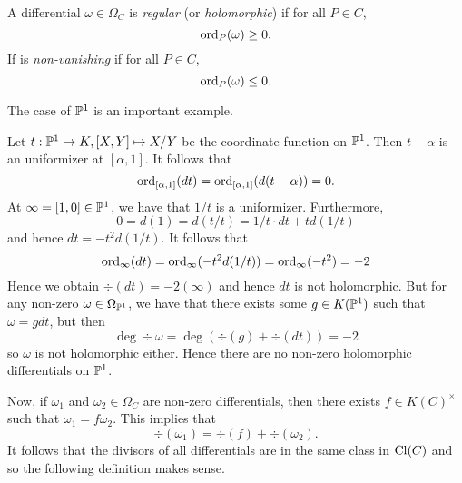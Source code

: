\begin{definition}
	A differential $\omega \in \Omega_C$ is \emph{regular} (or \emph{holomorphic})
	if for all $P \in C$,
	\begin{equation*}
		\operatorname{ord}_P(\omega) \geq 0.
	\end{equation*}
	If is \emph{non-vanishing} if for all $P \in C$,
	\begin{equation*}
		\operatorname{ord}_P(\omega) \leq 0.
	\end{equation*}
\end{definition}

The case of $\mathbb{P}^1$ is an important example.
\begin{example}
	\label{ex:proj-holomorphic}
	Let $t:\mathbb{P}^1 \to K, [X, Y]\mapsto X/Y$ be the coordinate function on
	$\mathbb{P}^1$. Then $t - \alpha$ is an uniformizer at $[\alpha, 1]$.
	It follows that
	\begin{equation*}
		\operatorname{ord}_{[\alpha, 1]}(dt) = \operatorname{ord}_{[\alpha, 1]}(d(t - \alpha)) = 0.
	\end{equation*}
	At $\infty = [1, 0]\in \mathbb{P}^1$, we have that $1/t$ is a uniformizer.
	Furthermore,
	\begin{equation*}
		0 = d(1) = d(t/t) = 1/t\cdot dt + td(1/t)
	\end{equation*}
	and hence $dt = -t^2d(1/t)$. It follows that 
	\begin{equation*}
		\operatorname{ord}_{\infty}(dt) = \operatorname{ord}_{\infty}(-t^2d(1/t)) = 
		\operatorname{ord}_{\infty}(-t^2) = -2
	\end{equation*}
	Hence we obtain $\div(dt) = -2(\infty)$ and hence $dt$ is not holomorphic.
	But for any non-zero $\omega \in \Omega_{\mathbb{P}^1}$, 
	we have that there exists some $g \in K(\mathbb{P}^1)$ such that 
	$\omega = gdt$, but then
	\begin{equation*}
		\deg\div \omega = \deg(\div(g) + \div(dt)) = -2
	\end{equation*}
	so $\omega$ is not holomorphic either.
	Hence there are no non-zero holomorphic differentials on $\mathbb{P}^1$.
\end{example}

Now, if $\omega_1$ and $\omega_2 \in \Omega_C$ are non-zero differentials, then
there exists $f\in K(C)^\times$ such that $\omega_1 = f\omega_2$.
This implies that
\begin{equation*}
	\div(\omega_1) = \div(f) + \div(\omega_2).
\end{equation*}
It follows that the divisors of all differentials are in the same class in
$\operatorname{Cl}(C)$ and so the following definition makes sense.


